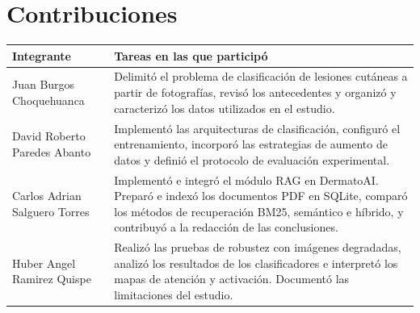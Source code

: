 \documentclass[conference]{IEEEtran}
\begin{document}





\section*{Contribuciones}

\begin{center}
\begin{tabular}{>{\raggedright\arraybackslash}p{}>{\raggedright\arraybackslash}p{}}
\toprule
Integrante & Tareas en las que participó \\
\midrule
Juan Burgos Choquehuanca &
Delimitó el problema de clasificación de lesiones cutáneas a partir de
fotografías, revisó los antecedentes y organizó y caracterizó los datos
utilizados en el estudio. \\

David Roberto Paredes Abanto &
Implementó las arquitecturas de clasificación, configuró el entrenamiento,
incorporó las estrategias de aumento de datos y definió el protocolo de
evaluación experimental. \\

Carlos Adrian Salguero Torres &
Implementó e integró el módulo RAG en DermatoAI. Preparó e indexó los
documentos PDF en SQLite, comparó los métodos de recuperación BM25,
semántico e híbrido, y contribuyó a la redacción de las conclusiones. \\

Huber Angel Ramirez Quispe &
Realizó las pruebas de robustez con imágenes degradadas, analizó los
resultados de los clasificadores e interpretó los mapas de atención y
activación. Documentó las limitaciones del estudio. \\
\bottomrule
\end{tabular}
\end{center}
\end{document}
